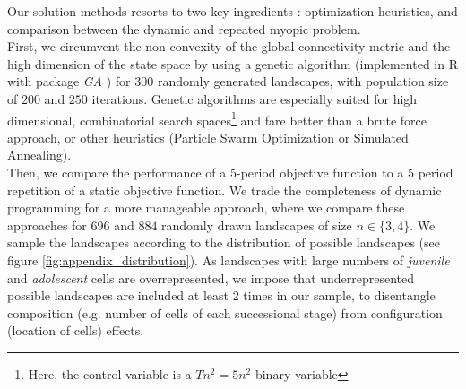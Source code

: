 Our solution methods resorts to two key ingredients : optimization heuristics, and comparison between the dynamic and repeated myopic problem. \\
First, we circumvent the non-convexity of the global connectivity metric and the high dimension of the state space by using a genetic algorithm \citep{holland_adaptation_1975} (implemented in \textsf{R} with package \textit{GA} \citep{GA_2017}) for 300 randomly generated landscapes, with population size of $200$ and $250$ iterations. Genetic algorithms are especially suited for high dimensional, combinatorial search spaces\footnote{Here, the control variable is a $Tn^2 = 5n^2$ binary variable} and fare better than a brute force approach, or other heuristics (Particle Swarm Optimization or Simulated Annealing). 
\\
Then, we compare the performance of a 5-period objective function to a 5 period repetition of a static objective function. We trade the completeness of dynamic programming for a more manageable approach, where we compare these approaches for $696$ and $884$ randomly drawn landscapes of size $n \in \{3,4\}$. We sample the landscapes according to the distribution of possible landscapes (see figure \ref{fig:appendix_distribution}). As landscapes with large numbers of \textit{juvenile} and \textit{adolescent} cells are overrepresented, we impose that underrepresented possible landscapes are included at least 2 times in our sample, to disentangle composition (e.g. number of cells of each successional stage) from configuration (location of cells) effects.

